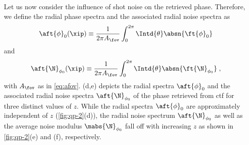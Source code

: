 \documentclass[
twoside,
openright,
titlepage,
numbers=noenddot,
headinclude,
fleqn,
a4paper,
footinclude=true,
cleardoublepage=empty,
abstractoff,
BCOR=5mm,
paper=a4,
fontsize=11pt,
british,ngerman,american,
]{scrreprt}
\begin{document}
Let us now consider the influence of shot noise on the retrieved
phase.  Therefore, we define the radial phase spectra and the
associated radial noise spectra as
\begin{equation}
  \label{eq:phi-radial-spectra}
  \aft{\phi}_0(\xip) \equiv 
  \frac{1}{2\pi A_\fov}\int_0^{2\pi}\Intd{\theta}\absn{\ft{\phi}_0}
\end{equation}
and
\begin{equation}
  \label{eq:phi-noise-radial-spectra}
  \aft{\N}_{\phi_0}(\xip) \equiv 
  \frac{1}{2\pi A_\fov}\int_0^{2\pi}\Intd{\theta}
  \absn{\ft{\N}_{\phi_0}} \;,
\end{equation}
with $A_\fov$ as in \cref{eq:afov}.  (d,e) depicts the
radial spectra $\aft{\phi}_0$ and the associated radial noise spectra
$\aft{\N}_{\phi_0}$ of the phase retrieved from \ac{ctf} for three
distinct values of $z$.  While the radial spectra $\aft{\phi}_0$ are
approximately independent of $z$ (\cref{fig:qp-2}(d)), the radial
noise spectrum $\aft{\N}_{\phi_0}$ as well as the average noise
modulus $\mabs{\N}_{\phi_0}$ fall off with increasing $z$ as shown in
\cref{fig:qp-2}(e) and (f), respectively.  
\end{document}
